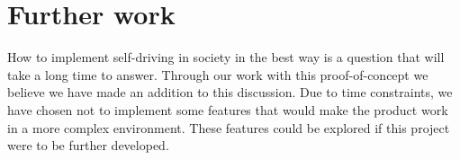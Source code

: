 \section{Further work}
How to implement self-driving in society in the best way is a question that will take a long time to answer. Through our work with this proof-of-concept we believe we have made an addition to this discussion. Due to time constraints, we have chosen not to implement some features that would make the product work in a more complex environment. These features could be explored if this project were to be further developed. 



